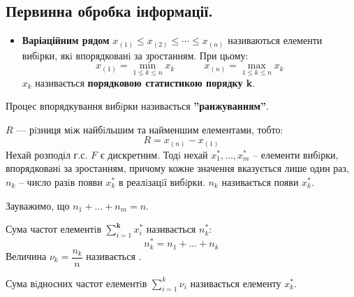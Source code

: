 \subsection{Первинна обробка інформації.}
\begin{itemize}
    \item \textbf{\color{javared}Варіаційним рядом} $x_{(1)} \leq x_{(2)} \leq \cdots \leq x_{(n)} $ називаються елементи вибiрки, якi
впорядкованi за зростанням. При цьому:
$$
x_{(1)} = \min\limits_{1 \leq k \leq n} x_k \qquad \quad x_{(n)} = \max\limits_{1 \leq k \leq n} x_k
$$
$x_k$ називається \textbf{\color{javadocblue}порядковою статистикою порядку k}.
\end{itemize}
Процес впорядкування вибiрки називається \textbf{\color{javadocblue}''ранжуванням''}.\par
{} $R$ --- рiзниця мiж найбiльшим та найменшим елементами, тобто:
$$
R = x_{(n)} - x_{(1)}
$$
Нехай розподіл г.с. $F$ є дискретним. Тодi нехай $x_1^* , \dots , x_m^*$ – елементи вибiрки, впорядкованi
за зростанням, причому кожне значення вказується лише один раз, $n_k$ – число разiв появи $x_k^*$ в реалiзацiї вибiрки.  $n_k$ називається  появи $x_k^*$.\par
Зауважимо, що $n_1 + \dots + n_m = n$.\par
Сума частот елементiв $ \displaystyle\sum\limits_{i = 1}^{ \textbf{k}}{x_i^*}$ називається  $n_k^*$:
$$
n_k^* = n_1 + ... + n_k
$$
Величина $\nu_k = \dfrac{n_k}{n}$ називається .\par
Сума вiдносних частот елементiв $\displaystyle  \sum\limits_{i = 1}^{k}{ \nu_i}$ називається  елементу $x_k^*$.\par
\newpage
